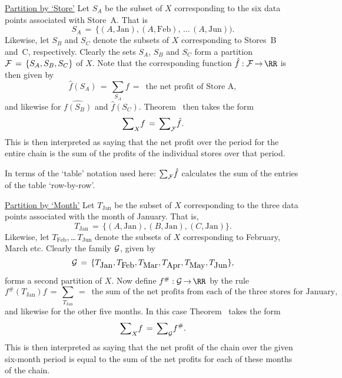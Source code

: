 {        \underline{Partition by `Store'} Let $S_{A}$ be the subset of $X$  corresponding to the six data points associated with Store~A. That is
        \begin{displaymath}
        S_{A} \,=\, \{(A,\mbox{Jan}), (A,\mbox{Feb}),\,{\ldots}\,(A,\mbox{Jun})).
        \end{displaymath}
    Likewise, let $S_{B}$ and  $S_{C}$ denote the subsets of $X$ corresponding to Stores~B and~C, respectively.
    Clearly the sets $S_{A}$, $S_{B}$ and $S_{C}$ form a partition ${\cal F} \,=\, \{S_{A},S_{B},S_{C}\}$ of $X$.
    Note that the corresponding function $\hat{f}:{\cal F} \,{\rightarrow}\, {\RR}$ is then given by
        \begin{displaymath}
        \hat{f}(S_{A}) \,=\, {\sum}_{S_{A}} f \,=\, \mbox{ the net profit of Store~A},
        \end{displaymath}
    and likewise for $\hat{f(S_{B})}$ and $\hat{f}(S_{C})$.
    Theorem~ then takes the form
        \begin{displaymath}
        {\sum}_{X} f \,=\, {\sum}_{{\cal F}} \hat{f}.
        \end{displaymath}
    This is then interpreted as saying that the net profit over the period for the entire chain is the sum of the profits of the individual stores over that period.

        In terms of the `table' notation used here: ${\sum}_{{\cal F}} \hat{f}$ calculates the sum of the entries of the table `row-by-row'.

\V

        \underline{Partition by `Month'} Let $T_{\mbox{Jan}}$ be the subset of $X$ corresponding to the three data points associated with the month of January.
    That is,
        \begin{displaymath}
        T_{\mbox{Jan}} \,=\, \{(A,\mbox{Jan}), (B,\mbox{Jan}), (C,\mbox{Jan})\}.
        \end{displaymath}
    Likewise, let $T_{\mbox{Feb}}$,\,{\ldots}\,$T_{\mbox{Jun}}$ denote the subsets of $X$ corresponding to February, March etc.
    Clearly the family ${\cal G}$, given by
        \begin{displaymath}
        {\cal G} \,=\, \{T_{\mbox{Jan}}, T_{\mbox{Feb}}, T_{\mbox{Mar}},
        T_{\mbox{Apr}}, T_{\mbox{May}}, T_{\mbox{Jun}}\},
        \end{displaymath}
    forms a second partition of $X$.
    Now define $f^{\#}:{\cal G} \,{\rightarrow}\, {\RR}$ by the rule
        \begin{displaymath}
        f^{\#}(T_{\mbox{Jan}}) f \,=\, {\sum}_{T_{\mbox{Jan}}} \,=\, \mbox{ the sum of the net profits from each of the three stores for January},
        \end{displaymath}
    and likewise for the other five months.
    In this case Theorem~ takes the form
        \begin{displaymath}
        {\sum}_{X} f \,=\, {\sum}_{{\cal G}} f^{\#}.
        \end{displaymath}
    This is then interpreted as saying that the net profit of the chain over the given six-month period is equal to the sum of the net profits for each of these months of the chain.

}
